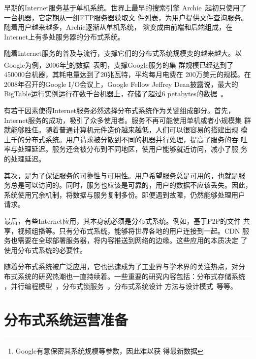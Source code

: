 早期的Internet服务基于单机系统。世界上最早的搜索引擎
Archie~\cite{archie}起初只使用了一台机器，它定期从一组FTP服务器获取文
件列表，为用户提供文件查询服务。随着用户越来越多，Archie逐渐从单机系统，
演变成由前端和后端组成，在Internet上有多处服务器的分布式系统。

随着Internet服务的普及与流行，支撑它们的分布式系统规模变的越来越大。以
Google为例，2006年\footnote{Google有意保密其系统规模等参数，因此难以获
得最新数据}的数据~\cite{how_google_works}表明，支撑Google服务的集
群规模已经达到了450000台机器，其耗电量达到了20兆瓦特，平均每月电费在
200万美元的规模。在2008年召开的Google I/O会议上，Google Fellow Jeffrey
Dean披露说，最大的BigTable运行实例运行在数千台机器上，存储了超过6
petabytes的数据~\cite{cnbeta_bigtable}。


有若干因素使得Internet服务必然选择分布式系统作为关键组成部分。首先，
Internet服务的成功，吸引了众多使用者。服务不再可能使用单机或者小规模集
群就能够胜任。随着普通计算机元件造价越来越低，人们可以很容易的搭建出规
模上千的分布式系统。用户请求被分散到不同的机器并行处理，提高了服务的吞
吐率与处理延迟。服务还会被分布到不同地区，使用户能够就近访问，减小了服
务的处理延迟。

其次，是为了保证服务的可靠性与可用性。用户希望服务总是可用的，也就是服
务总是可以访问的。同时，服务也应该是可靠的，用户的数据不应该丢失。因此，
系统使用冗余机制，将数据与服务复制多份。即便遇到故障，仍然能够处理用户
请求。

最后，有些Internet应用，其本身就必须是分布式系统。例如，基于P2P的文件
共享，视频组播等。只有分布式系统，能够将世界各地的用户连接到一起。CDN
服务也需要在全球部署服务器，将内容推送到网络的边缘。这些应用的本质决定
了使用分布式系统的必要性。


随着分布式系统被广泛应用，它也迅速成为了工业界与学术界的关注热点，对分
布式系统的研究热潮也一直持续着。一些重要的研究内容包括：分布式存储系统~
\cite{gfs, bigtable, dynamo, pacifica}，并行编程模型~\cite{mapreduce,
sawzall, dryad, dryadlinq}，分布式锁服务~\cite{chubby}，分布式系统设计
方法与设计模式~\cite{sinfonia, boxwood, seda, mace, macedon, p2}等等。

\section{分布式系统运营准备}

